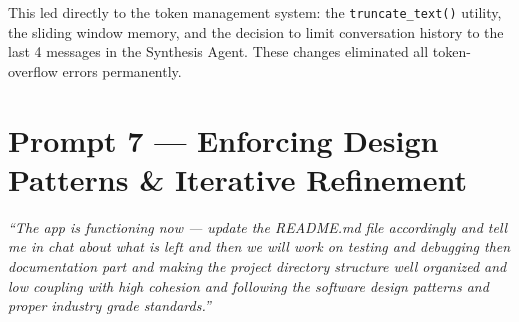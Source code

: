 \documentclass[12pt, a4paper]{article}
\begin{document}
\begin{impactbox}
This led directly to the token management system: the \texttt{truncate\_text()} utility, the sliding window memory, and the decision to limit conversation history to the last 4 messages in the Synthesis Agent. These changes eliminated all token-overflow errors permanently.
\end{impactbox}

\section{Prompt 7 — Enforcing Design Patterns \& Iterative Refinement}

\begin{promptbox}
\textit{``The app is functioning now — update the README.md file accordingly and tell me in chat about what is left and then we will work on testing and debugging then documentation part and making the project directory structure well organized and low coupling with high cohesion and following the software design patterns and proper industry grade standards.''}
\end{promptbox}
\end{document}

